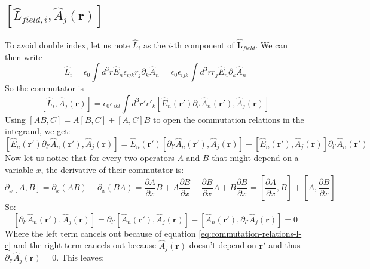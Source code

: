 \documentclass{article}
\begin{document}
\subsection{$\left[\hat{L}_{field, i}, \hat{A}_j(\boldsymbol{r})\right]$}
To avoid double index, let us note $\hat{L}_i$ as the $i$-th component of $\hat{\boldsymbol{L}}_{field}$. We can then write
\begin{equation}
    \hat{L}_{i} = \epsilon_0 \int d^3 r \hat{E}_n \epsilon_{ijk}r_j \partial_k\hat{A}_n = \epsilon_0 \epsilon_{ijk} \int d^3 r r_j \hat{E}_n \partial_k\hat{A}_n
\end{equation}
So the commutator is
\begin{equation}
    \left[\hat{L}_{i}, \hat{A}_j(\boldsymbol{r})\right] = \epsilon_0 \epsilon_{ikl} \int d^3 r' r'_k \left[\hat{E}_n(\boldsymbol{r'}) \partial_{l'}\hat{A}_n(\boldsymbol{r'}), \hat{A}_j(\boldsymbol{r})\right]
\end{equation}
Using $[AB,C] = A[B,C] + [A,C]B$ to open the commutation relations in the integrand, we get:
\begin{equation}
    \left[\hat{E}_n(\boldsymbol{r'}) \partial_{l'}\hat{A}_n(\boldsymbol{r'}), \hat{A}_j(\boldsymbol{r})\right] = 
    \hat{E}_n(\boldsymbol{r'}) \left[\partial_{l'}\hat{A}_n(\boldsymbol{r'}), \hat{A}_j(\boldsymbol{r})\right] + 
    \left[\hat{E}_n(\boldsymbol{r'}), \hat{A}_j(\boldsymbol{r})\right]\partial_{l'}\hat{A}_n(\boldsymbol{r'})
\end{equation}
Now let us notice that for every two operators $A$ and $B$ that might depend on a variable $x$, the derivative of their commutator is:
\begin{equation}
    \partial_x\left[A,B\right] = \partial_x\left(AB\right) - \partial_x\left(BA\right) = \frac{\partial A}{\partial x}B + A\frac{\partial B}{\partial x} - \frac{\partial B}{\partial x}A + B\frac{\partial B}{\partial x} = \left[\frac{\partial A}{\partial x},B\right] + \left[A,\frac{\partial B}{\partial x}\right]
\end{equation}
So:
\begin{equation}
    \left[\partial_{l'}\hat{A}_n(\boldsymbol{r'}), \hat{A}_j(\boldsymbol{r})\right] = 
    \partial_{l'}\left[\hat{A}_n(\boldsymbol{r'}), \hat{A}_j(\boldsymbol{r})\right] - \left[\hat{A}_n(\boldsymbol{r'}), \partial_{l'}\hat{A}_j(\boldsymbol{r})\right] = 0
\end{equation}
Where the left term cancels out because of equation \ref{eq:commutation-relations-l-e} and the right term cancels out because $\hat{A}_j(\boldsymbol{r})$ doesn't depend on $\boldsymbol{r'}$ and thus $\partial_{l'}\hat{A}_j(\boldsymbol{r}) = 0$. This leaves:
\end{document}
